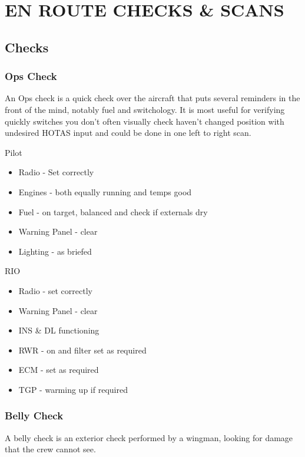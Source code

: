\section{EN ROUTE CHECKS \& SCANS}

\subsection{Checks}

\subsubsection{Ops Check}

An Ops check is a quick check over the aircraft that puts several reminders in
the front of the mind, notably fuel and switchology. It is most useful for
verifying quickly switches you don't often visually check haven't changed
position with undesired HOTAS input and could be done in one left to right
scan.

Pilot

\begin{itemize}
  \item Radio - Set correctly
  \item Engines - both equally running and temps good
  \item Fuel - on target, balanced and check if externals dry
  \item Warning Panel - clear
  \item Lighting - as briefed
\end{itemize}

RIO

\begin{itemize}
  \item Radio - set correctly
  \item Warning Panel - clear
  \item INS \& DL functioning
  \item RWR - on and filter set as required
  \item ECM - set as required
  \item TGP - warming up if required
\end{itemize}

\subsubsection{Belly Check}

A belly check is an exterior check performed by a wingman, looking for damage
that the crew cannot see.


